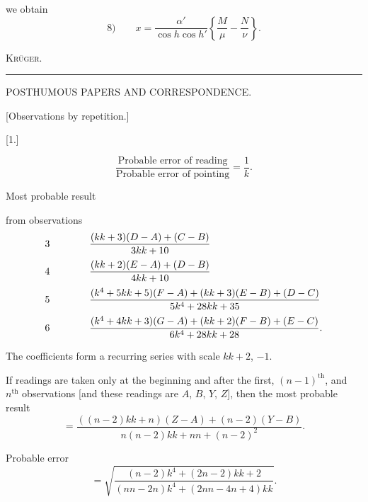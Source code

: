 \noindent we obtain
\[
\text{8)}\qquad x=\frac{\alpha'}{\cos h\cos h'}\left\{\frac M\mu-\frac N\nu\right\}.
\]
\begin{flushright}\textsc{Krüger.}\end{flushright}
\par\endgroup
\begin{center}\rule{3.5cm}{.4pt}\end{center}
\noindent{}\par

\par\clearpage
\begin{center}
{\Large POSTHUMOUS PAPERS AND CORRESPONDENCE.}\par\vspace{1cm}
{\large [Observations by repetition.]}\par\bigskip
{[}1.]
\end{center}
\[
\frac{\text{Probable error of reading}}{\text{Probable error of pointing}}=\frac1k.
\]
\begin{center}Most probable result\end{center}
\noindent from observations
\[
\begin{array}{c@{\qquad\qquad}l}
3&\dfrac{(kk+3)(D-A)+(C-B)}{3kk+10}\\[10pt]
4&\dfrac{(kk+2)(E-A)+(D-B)}{4kk+10}\\[10pt]
5&\dfrac{(k^4+5kk+5)(F-A)+(kk+3)(E-B)+(D-C)}{5k^4+28kk+35}\\[10pt]
6&\dfrac{(k^4+4kk+3)(G-A)+(kk+2)(F-B)+(E-C)}{6k^4+28kk+28}.
\end{array}
\]
\par\noindent\hspace*{\parindent}The coefficients form a recurring series with scale $kk+2$, $-1$.
\par\bigskip\noindent\hspace*{\parindent}If readings are taken only at the beginning and after the first, $(n-1)^{\text{th}}$, and $n^{\text{th}}$ observations [and these readings are $A$, $B$, $Y$, $Z$], then the most probable result
\[
=\frac{((n-2)kk+n)(Z-A)+(n-2)(Y-B)}{n(n-2)kk+nn+(n-2)^2}.
\]
\par\noindent\hspace*{\parindent}Probable error
\[
=\sqrt{\frac{(n-2)k^4+(2n-2)kk+2}{(nn-2n)k^4+(2nn-4n+4)kk}}.
\]

